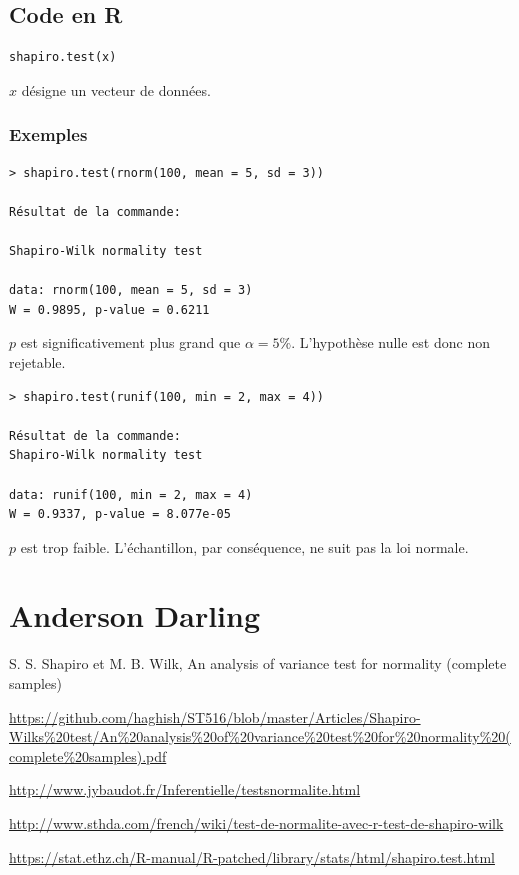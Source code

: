 \documentclass[12pt,a4paper]{article}
\begin{document}
\subsection{Code en R}
\begin{verbatim}
shapiro.test(x)
\end{verbatim}

$x$ désigne un vecteur de données.

\subsubsection*{Exemples}
\begin{verbatim}
> shapiro.test(rnorm(100, mean = 5, sd = 3))

Résultat de la commande:

Shapiro-Wilk normality test

data: rnorm(100, mean = 5, sd = 3)
W = 0.9895, p-value = 0.6211
\end{verbatim}

$p$ est significativement plus grand que $\alpha=5\%$. L'hypothèse nulle est donc non rejetable.

\begin{verbatim}
> shapiro.test(runif(100, min = 2, max = 4))

Résultat de la commande:
Shapiro-Wilk normality test

data: runif(100, min = 2, max = 4)
W = 0.9337, p-value = 8.077e-05
\end{verbatim}

$p$ est trop faible. L'échantillon, par conséquence, ne suit pas la loi normale.
\section{Anderson Darling}

\clearpage

\begin{thebibliography}{3}

S. S. Shapiro et M. B. Wilk, An analysis of variance test for normality (complete samples)

\url{https://github.com/haghish/ST516/blob/master/Articles/Shapiro-Wilks%20test/An%20analysis%20of%20variance%20test%20for%20normality%20(complete%20samples).pdf}

\url{http://www.jybaudot.fr/Inferentielle/testsnormalite.html}

\url{http://www.sthda.com/french/wiki/test-de-normalite-avec-r-test-de-shapiro-wilk}

\url{https://stat.ethz.ch/R-manual/R-patched/library/stats/html/shapiro.test.html}
\end{thebibliography}
\end{document}

